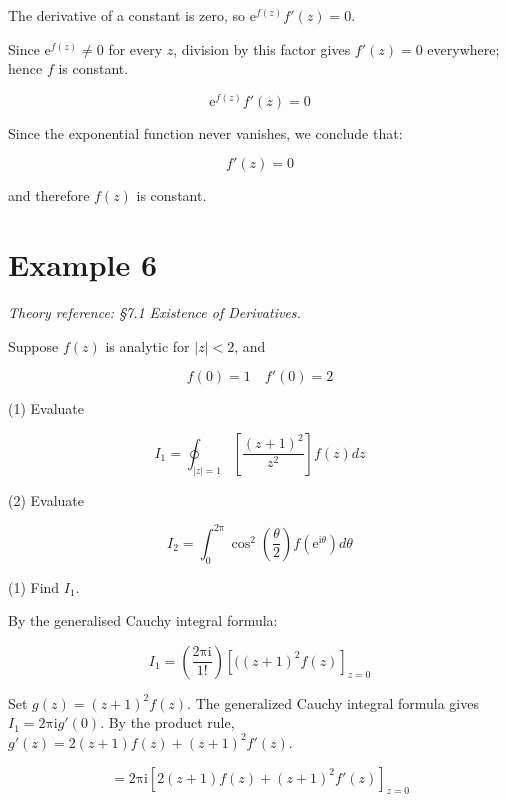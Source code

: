 \documentclass[11pt,a4paper]{article}
\theoremstyle{definition}
\theoremstyle{plain}
\begin{document}
The derivative of a constant is zero, so $\mathrm{e}^{f(z)}f'(z) = 0$.

Since $\mathrm{e}^{f(z)} \ne 0$ for every $z$, division by this factor gives $f'(z) = 0$ everywhere; hence $f$ is constant.

\begin{equation}
\mathrm{e}^{f(z)}f'(z) = 0
\end{equation}

Since the exponential function never vanishes, we conclude that:

\begin{equation}
f'(z) = 0
\end{equation}

and therefore $f(z)$ is constant.

\section*{Example 6}

\textit{Theory reference: §7.1 Existence of Derivatives.}

Suppose $f(z)$ is analytic for $\vert{}z\vert{} < 2$, and

\begin{equation}
f(0) = 1\quad f'(0) = 2
\end{equation}

(1) Evaluate

\begin{equation}
I_{1} = \oint_{\vert{}z\vert{} = 1}[\frac{{(z + 1)}^{2}}{z^{2}}]f(z)dz
\end{equation}

(2) Evaluate

\begin{equation}
I_{2} = \int_{0}^{2\mathrm{\pi}}\cos^{2}\left(\frac{\theta}{2}\right)f(\mathrm{e}^{\mathrm{i}\theta}) d\theta
\end{equation}

(1) Find $I_{1}$.

By the generalised Cauchy integral formula:

\begin{equation}
I_{1} = \left(\frac{2\mathrm{\pi}\mathrm{i}}{1!}\right){[((z + 1)^{2}f(z)]}_{z = 0}
\end{equation}

Set $g(z) = (z + 1)^{2}f(z)$. The generalized Cauchy integral formula gives $I_{1} = 2\mathrm{\pi}\mathrm{i}g'(0)$. By the product rule, $g'(z) = 2(z + 1)f(z) + (z + 1)^{2}f'(z)$.

\[
= 2\mathrm{\pi}\mathrm{i}{[2(z + 1)f(z) + (z + 1)^{2}f'(z)]}_{z = 0}
\]
\end{document}
